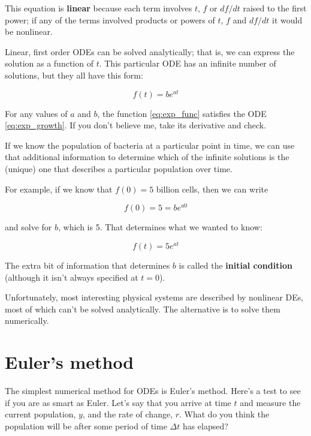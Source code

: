 \documentclass{book}
\begin{document}
This equation is {\bf linear} because each term involves $t$, $f$ or
$df/dt$ raised to the first power; if any of the terms involved
products or powers of $t$, $f$ and $df/dt$ it would be
nonlinear.

Linear, first order ODEs can be solved analytically; that is, we
can express the solution as a function of $t$.
This particular ODE has an infinite number of solutions, but
they all have this form:

\begin{equation}\label{eq:exp_func}
f(t) = b e^{at}
\end{equation}


For any values of $a$ and $b$, the function \eqref{eq:exp_func} satisfies
the ODE \eqref{eq:exp_growth}.  If you don't believe me, take its
derivative and check.

If we know the population of bacteria at a particular point in time,
we can use that additional information to determine which of the
infinite solutions is the (unique) one that describes a particular
population over time.

For example, if we know that $f(0) = 5$ billion cells, then we
can write

\begin{equation}
f(0) = 5 = b e^{a 0}
\end{equation}


and solve for $b$, which is 5.  That determines what we wanted
to know:

\begin{equation}
f(t) = 5 e^{at}
\end{equation}


The extra bit of information that determines $b$ is called
the {\bf initial condition} (although it isn't always specified
at $t=0$).

Unfortunately, most interesting physical systems are described by
nonlinear DEs, most of which can't be solved analytically.  The
alternative is to solve them numerically.


\section{Euler's method}

The simplest numerical method for ODEs is Euler's method.  Here's a
test to see if you are as smart as Euler.  Let's say that you
arrive at time $t$ and measure the current population, $y$, and
the rate of change, $r$.  What do you think the population will
be after some period of time $\Delta t$ has elapsed?
\end{document}
